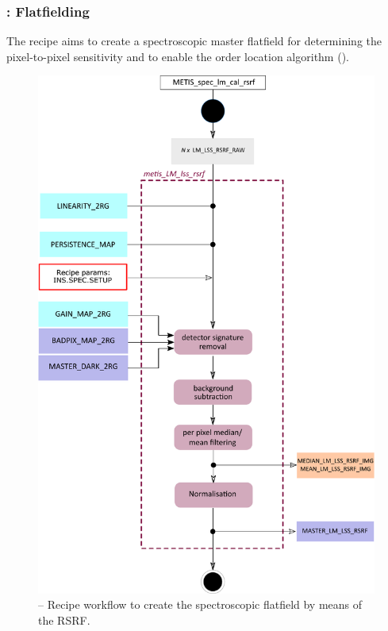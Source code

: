 \subsubsection{:  Flatfielding}\label{rec:metis_lm_lss_rsrf}
The recipe  aims to create a spectroscopic master flatfield for determining the pixel-to-pixel sensitivity and to enable the order location algorithm ().
\begin{figure}[ht]
  \centering
  \includegraphics[width=0.5\textheight]{figures/metis_lm_lss_rsrf_v0.83.pdf}
  \caption[Recipe: ]{ --
    Recipe workflow to create the spectroscopic flatfield by means of the \ac{RSRF}.}
  \label{Fig:rec_lm_lss_rsrf}
\end{figure}


